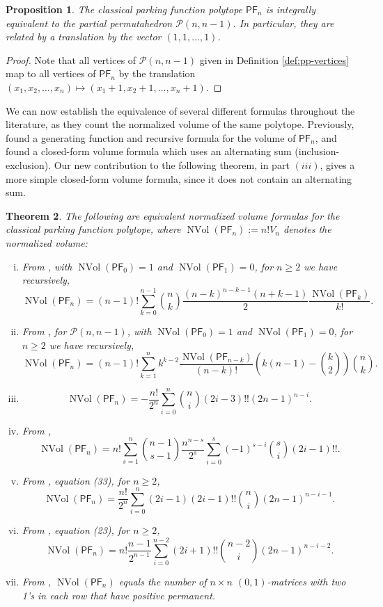 \documentclass[11pt]{amsart}
\newtheorem{theorem}{Theorem}[section]
\newtheorem{proposition}[theorem]{Proposition}
\theoremstyle{definition}
\newcommand{\0}{\emptyset}
\newcommand{\PF}{\mathsf{PF}}
\DeclareMathOperator{\nVol}{NVol}
\begin{document}
\begin{proposition}\label{prop:classical-partial}
The classical parking function polytope $\PF_n$ is integrally equivalent to the partial permutahedron $\mathcal{P}(n, n-1)$. In particular, they are related by a translation by the vector $(1,1, \ldots, 1)$.
\end{proposition}

\begin{proof}
Note that all vertices of $\mathcal{P}(n,n-1)$ given in Definition \ref{def:pp-vertices} map to all vertices of $\PF_n$ by the translation $(x_1, x_2, \ldots, x_n) \mapsto (x_1 +1, x_2 +1, \ldots, x_n+1)$.
\end{proof}

We can now establish the equivalence of several different formulas throughout the literature, as they count the normalized volume of the same polytope. 
Previously, \cite{AW} found a generating function and recursive formula for the volume of $\PF_n$, and \cite{Sto} found a closed-form volume formula which uses an alternating sum (inclusion-exclusion). Our new contribution to the following theorem, in part $(iii)$, gives a more simple closed-form volume formula, since it does not contain an alternating sum.


\begin{theorem}\label{thm:main_theorem}
The following are equivalent normalized volume formulas for the classical parking function polytope, where $\nVol(\PF_n) := n!V_n$ denotes the normalized volume:
\begin{enumerate}[(i)]
    \item From \cite{AW}, with $\nVol(\PF_{0})=1$ and $\nVol(\PF_{1})=0$, for $n \geq 2$ we have recursively, \[ \nVol(\PF_n) = (n-1)! \sum_{k=0}^{n-1} \binom{n}{k} \frac{(n-k)^{n-k-1}(n+k-1)}{2} \frac{\nVol(\PF_k)}{k!}.\]
    \item From \cite{BCC}, for $\mathcal{P}(n,n-1)$, with $\nVol(\PF_{0})=1$ and $\nVol(\PF_{1})=0$, for $n \geq 2$ we have recursively,
    \[ \nVol(\PF_n) = (n-1)! \sum_{k=1}^n k^{k-2} \frac{\nVol(\PF_{n-k})}{(n-k)!} \left(k(n-1)- \binom{k}{2}\right) \binom{n}{k}.\]
    \item  \[\nVol(\PF_n) = - \frac{n!}{2^n}\sum_{i=0}^n \binom{n}{i}(2i-3)!!(2n-1)^{n-i}.\]
    \item From \cite{Sto},
    \[\nVol(\PF_n) = n! \sum_{s=1}^n \binom{n-1}{s-1} \frac{n^{n-s}}{2^s} \sum_{i=0}^s (-1)^{s-i}\binom{s}{i}(2i-1)!!. \]
    \item From \cite{She}, equation (33), for $n \geq 2$, \[\nVol(\PF_n)=\frac{n!}{2^n}\sum_{i=0}^{n} (2i-1)(2i-1)!!\binom{n}{i}(2n-1)^{n-i-1}.\]
    \item From \cite{She}, equation (23), for $n \geq 2$, \[\nVol(\PF_n) = n!\frac{n-1}{2^{n-1}}\sum_{i=0}^{n-2}(2i+1)!!\binom{n-2}{i}(2n-1)^{n-i-2}. \]
    \item From \cite{She}, $\nVol(\PF_n)$ equals the number of $n \times n$ $(0,1)$-matrices with two 1's in each row that have positive permanent.
\end{enumerate}
\end{theorem}
\end{document}
